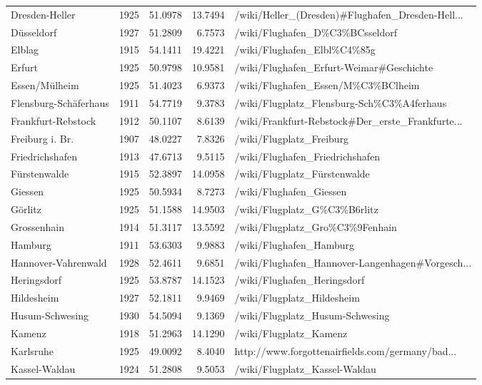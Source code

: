 \begin{table}[h!]
{\begin{tabular}{p{2.8cm}rrrp{6cm}}
  Dresden-Heller & 1925 & 51.0978 & 13.7494 & /wiki/Heller\_(Dresden)\#Flughafen\_Dresden-Hell... \\ 
  D\"usseldorf  & 1927 & 51.2809 & 6.7573 & /wiki/Flughafen\_D\%C3\%BCsseldorf \\ 
   \midrule
Elblag & 1915 & 54.1411 & 19.4221 & /wiki/Flughafen\_Elbl\%C4\%85g \\ 
  Erfurt & 1925 & 50.9798 & 10.9581 & /wiki/Flughafen\_Erfurt-Weimar\#Geschichte \\ 
  Essen/M\"ulheim & 1925 & 51.4023 & 6.9373 & /wiki/Flughafen\_Essen/M\%C3\%BClheim \\ 
  Flensburg-Sch\"aferhaus & 1911 & 54.7719 & 9.3783 & /wiki/Flugplatz\_Flensburg-Sch\%C3\%A4ferhaus \\ 
  Frankfurt-Rebstock & 1912 & 50.1107 & 8.6139 & /wiki/Frankfurt-Rebstock\#Der\_erste\_Frankfurte... \\ 
  Freiburg i. Br. & 1907 & 48.0227 & 7.8326 & /wiki/Flugplatz\_Freiburg \\ 
  Friedrichshafen & 1913 & 47.6713 & 9.5115 & /wiki/Flughafen\_Friedrichshafen \\ 
  F\"urstenwalde & 1915 & 52.3897 & 14.0958 & /wiki/Flugplatz\_F\"urstenwalde \\ 
  Giessen & 1925 & 50.5934 & 8.7273 & /wiki/Flughafen\_Giessen \\ 
  G\"orlitz & 1925 & 51.1588 & 14.9503 & /wiki/Flugplatz\_G\%C3\%B6rlitz \\ 
   \midrule
Grossenhain & 1914 & 51.3117 & 13.5592 & /wiki/Flugplatz\_Gro\%C3\%9Fenhain \\ 
  Hamburg  & 1911 & 53.6303 & 9.9883 & /wiki/Flughafen\_Hamburg \\ 
  Hannover-Vahrenwald & 1928 & 52.4611 & 9.6851 & /wiki/Flughafen\_Hannover-Langenhagen\#Vorgesch... \\ 
  Heringsdorf & 1925 & 53.8787 & 14.1523 & /wiki/Flughafen\_Heringsdorf \\ 
  Hildesheim & 1927 & 52.1811 & 9.9469 & /wiki/Flugplatz\_Hildesheim \\ 
  Husum-Schwesing & 1930 & 54.5094 & 9.1369 & /wiki/Flugplatz\_Husum-Schwesing \\ 
  Kamenz & 1918 & 51.2963 & 14.1290 & /wiki/Flugplatz\_Kamenz \\ 
  Karlsruhe & 1925 & 49.0092 & 8.4040 & http://www.forgottenairfields.com/germany/bad... \\ 
  Kassel-Waldau & 1924 & 51.2808 & 9.5053 & /wiki/Flugplatz\_Kassel-Waldau \\ 

\end{tabular}}
\end{table}
